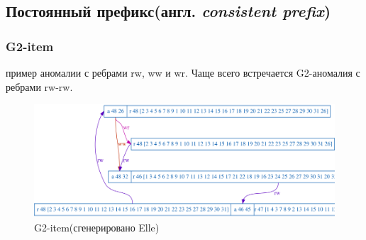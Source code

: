 \documentclass[12pt,  openany]{book}
\begin{document}
\subsection{Постоянный префикс(англ.  \textit{consistent prefix})}
\subsubsection{G2-item}
пример аномалии с ребрами rw, ww и wr. Чаще всего встречается G2-аномалия с ребрами rw-rw.
\begin{figure}[H]
  \includegraphics[width=\textwidth]{prefix/7.png}
  \caption{G2-item(сгенерировано Elle)}
\end{figure}
\par
\end{document}
